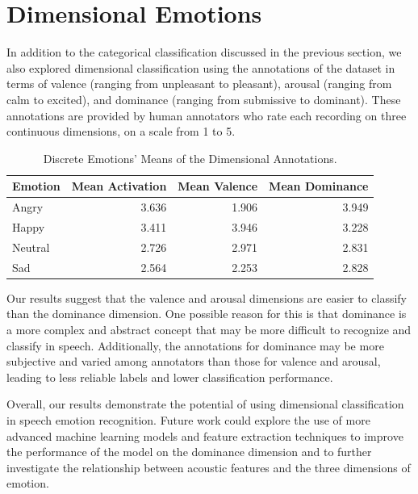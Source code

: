 \section{Dimensional Emotions}

In addition to the categorical classification discussed in the previous section, we also explored dimensional classification using the annotations of the dataset in terms of valence (ranging from unpleasant to pleasant), arousal (ranging from calm to excited), and dominance (ranging from submissive to dominant). These annotations are provided by human annotators who rate each recording on three continuous dimensions, on a scale from 1 to 5.



\begin{table}[H]
	\centering
	\caption{Discrete Emotions' Means of the Dimensional Annotations.}
	\label{tab:dis_dim}
	\begin{tabular}{lrrr}
		\toprule
		Emotion & Mean Activation &   Mean Valence & Mean Dominance \\
		\midrule
		Angry   &   3.636 &  1.906 &  3.949 \\
		Happy   &   3.411 &  3.946 &  3.228 \\
		Neutral &   2.726 &  2.971 &  2.831 \\
		Sad     &   2.564 &  2.253 &  2.828 \\
		\bottomrule
	\end{tabular}
\end{table}




Our results suggest that the valence and arousal dimensions are easier to classify than the dominance dimension. One possible reason for this is that dominance is a more complex and abstract concept that may be more difficult to recognize and classify in speech. Additionally, the annotations for dominance may be more subjective and varied among annotators than those for valence and arousal, leading to less reliable labels and lower classification performance.

Overall, our results demonstrate the potential of using dimensional classification in speech emotion recognition. Future work could explore the use of more advanced machine learning models and feature extraction techniques to improve the performance of the model on the dominance dimension and to further investigate the relationship between acoustic features and the three dimensions of emotion.




